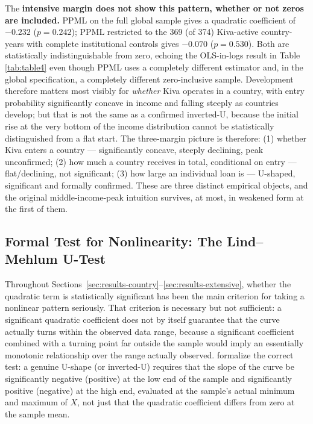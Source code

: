 \documentclass[12pt]{article}
\begin{document}
The \textbf{intensive margin does not show this pattern, whether or not zeros are included.} PPML on
the full global sample gives a quadratic coefficient of $-0.232$ ($p=0.242$); PPML restricted to the
369 (of 374) Kiva-active country-years with complete institutional controls gives $-0.070$
($p=0.530$). Both are statistically indistinguishable from zero, echoing the OLS-in-logs result in
Table \ref{tab:table4} even though PPML uses a completely different estimator and, in the global
specification, a completely different zero-inclusive sample. Development therefore matters most
visibly for \emph{whether} Kiva operates in a country, with entry probability significantly concave in
income and falling steeply as countries develop; but that is not the same as a confirmed inverted-U,
because the initial rise at the very bottom of the income distribution cannot be statistically
distinguished from a flat start. The three-margin picture is therefore: (1) whether Kiva enters a
country --- significantly concave, steeply declining, peak unconfirmed; (2) how much a country
receives in total, conditional on entry --- flat/declining, not significant; (3) how large an
individual loan is --- U-shaped, significant and formally confirmed. These are three distinct
empirical objects, and the original middle-income-peak intuition survives, at most, in weakened form
at the first of them.

\subsection{Formal Test for Nonlinearity: The Lind--Mehlum U-Test}
\label{sec:utest}

Throughout Sections~\ref{sec:results-country}--\ref{sec:results-extensive}, whether the quadratic term
is statistically significant has been the main criterion for taking a nonlinear pattern seriously.
That criterion is necessary but not sufficient: a significant quadratic coefficient does not by itself
guarantee that the curve actually turns within the observed data range, because a significant
coefficient combined with a turning point far outside the sample would imply an essentially monotonic
relationship over the range actually observed. \citet{lindmehlum2010} formalize the correct test: a
genuine U-shape (or inverted-U) requires that the slope of the curve be significantly negative
(positive) at the low end of the sample and significantly positive (negative) at the high end,
evaluated at the sample's actual minimum and maximum of $X$, not just that the quadratic coefficient
differs from zero at the sample mean.
\end{document}
